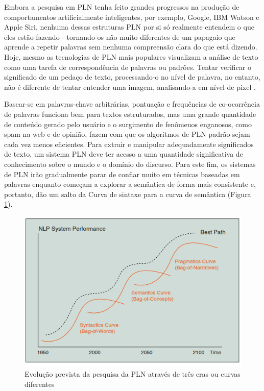 \documentclass[
	12pt,				%
	openright,			%
	oneside,			%
	a4paper,			%
	english,			%
	spanish,			%
	brazil				%
	]{abntex2}
\begin{document}
Embora a pesquisa em PLN tenha feito grandes progressos na produção de comportamentos artificialmente inteligentes, por exemplo, Google, IBM Watson e Apple Siri, nenhuma dessas estruturas PLN por si só realmente entendem o que eles estão fazendo - tornando-os não muito diferentes de um papagaio que aprende a repetir palavras sem nenhuma compreensão clara do que está dizendo. Hoje, mesmo as tecnologias de PLN mais populares visualizam a análise de texto como uma tarefa de correspondência de palavras ou padrões. Tentar verificar o significado de um pedaço de texto, processando-o no nível de palavra, no entanto, não é diferente de tentar entender uma imagem, analisando-a em nível de pixel \cite{book_Cambria2015}. 

Basear-se em palavras-chave arbitrárias, pontuação e frequências de co-ocorrência de palavras funciona bem para textos estruturados, mas uma grande quantidade de conteúdo gerado pelo usuário e o surgimento de fenômenos enganosos, como spam na web e de opinião, fazem com que os algoritmos de PLN padrão sejam cada vez menos eficientes. Para extrair e manipular adequadamente significados de texto, um sistema PLN deve ter acesso a uma quantidade significativa de conhecimento sobre o mundo e o domínio do discurso.
Para este fim, os sistemas de PLN irão gradualmente parar de confiar muito em técnicas baseadas em palavras enquanto começam a explorar a semântica de forma mais consistente e, portanto, dão um salto da Curva de sintaxe para a curva de semântica (Figura \ref{NLPCurve}).

\begin{figure}[!htb]
\centering
\includegraphics{NLPCurve}
\caption{Evolução prevista da pesquisa da PLN através de três eras ou curvas diferentes \cite{book_Cambria2015}}
\label{NLPCurve}
\end{figure}
\end{document}
